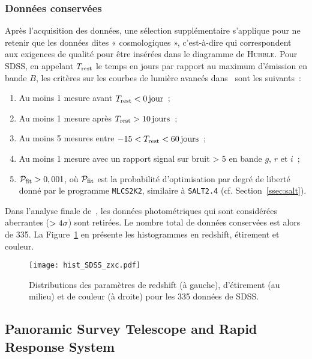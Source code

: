 \documentclass[../main/main.tex]{subfiles}
\begin{document}
\subsubsection{Données conservées}\label{sssec:sdssdata}

Après l'acquisition des données, une sélection supplémentaire s'applique pour ne
retenir que les données dites « cosmologiques », c'est-à-dire qui correspondent
aux exigences de qualité pour être insérées dans le diagramme de
\textsc{Hubble}. Pour SDSS, en appelant $T_{\rm rest}$ le temps en jours par
rapport au maximum d'émission en bande $B$, les critères sur les courbes de
lumière avancés dans~\cite{kessler2009b} sont les suivants~:

\begin{enumerate}
    \item Au moins 1 mesure avant $T_{\rm rest} < \SI{0}{jour}$~;
    \item Au moins 1 mesure après $T_{\rm rest} > \SI{10}{jours}$~;
    \item Au moins 5 mesures entre $-15 < T_{\rm rest} < \SI{60}{jours}$~;
    \item Au moins 1 mesure avec un rapport signal sur bruit > 5 en bande $g$,
        $r$ et $i$~;
    \item $\mathcal{P}_{\rm fit} > 0,001$, où $\mathcal{P}_{\rm fit}$ est la
        probabilité d'optimisation par degré de liberté donné par le programme
        \texttt{MLCS2K2}, similaire à \texttt{SALT2.4} (cf.
        Section~\ref{ssec:salt}).
\end{enumerate}
Dans l'analyse finale de~\cite{scolnic2018}, les données photométriques qui sont
considérées aberrantes ($>4\sigma$) sont retirées. Le nombre total de données
conservées est alors de 335. La Figure~\ref{fig:sdsshist} en présente les
histogrammes en redshift, étirement et couleur.

\begin{figure}[ht]
    \centering
    \texttt{[image: hist\_SDSS\_zxc.pdf]}
    \captionsetup{justification=centering}
    \caption{Distributions des paramètres de redshift (à gauche), d'étirement (au
    milieu) et de couleur (à droite) pour les 335 données de SDSS.}
    \label{fig:sdsshist}
\end{figure}

\subsection{Panoramic Survey Telescope and Rapid Response
System}\label{ssec:ps1}
\end{document}
